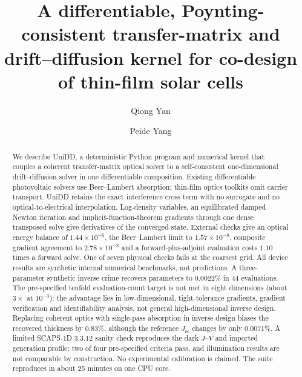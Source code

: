 \documentclass[preprint,12pt]{elsarticle}
\begin{document}
\begin{frontmatter}

\title{A differentiable, Poynting-consistent transfer-matrix and drift--diffusion kernel for co-design of thin-film solar cells}

\author[addr1]{Qiong Yan}

\author[addr2,addr3]{Peide Yang}

\address[addr1]{Department of Electronic Information Science, Fujian Jiangxia
University, Fuzhou 350108, China}
\address[addr2]{School of Electronic Science and Technology, Xiamen University
Tan Kah Kee College, Xiamen, China}
\address[addr3]{Xiamen University Tan Kah Kee College, Key Laboratory of
Intelligent Manufacturing Equipment and Industrial Internet Technology for
Universities of Fujian Province, Xiamen, China}

\begin{abstract}
We describe UniDD, a deterministic Python program and numerical kernel that
couples a coherent transfer-matrix optical solver to a self-consistent
one-dimensional drift--diffusion solver in one differentiable composition.
Existing differentiable photovoltaic solvers use Beer--Lambert absorption;
thin-film optics toolkits omit carrier transport. UniDD retains the exact
interference cross term with no surrogate and no optical-to-electrical
interpolation. Log-density variables, an equilibrated damped Newton iteration
and implicit-function-theorem gradients through one dense transposed solve
give derivatives of the converged state. External checks give an optical
energy balance of $1.44\times10^{-6}$, the Beer--Lambert limit to
$1.57\times10^{-8}$, composite gradient agreement to $2.78\times10^{-3}$ and
a forward-plus-adjoint evaluation costs $1.10$ times a forward solve. One of
seven physical checks fails at the coarsest grid. All device results are
synthetic internal numerical benchmarks, not predictions. A three-parameter
synthetic inverse crime recovers parameters to $0.0022\%$ in 44 evaluations.
The pre-specified tenfold evaluation-count target is not met in eight
dimensions (about $3\times$ at $10^{-3}$): the advantage lies in
low-dimensional, tight-tolerance gradients, gradient verification and
identifiability analysis, not general high-dimensional inverse design.
Replacing coherent optics with single-pass absorption in inverse design
biases the recovered thickness by 0.83\%, although the reference
$J_{\mathrm{sc}}$ changes by only $0.0071\%$. A limited SCAPS-1D 3.3.12
sanity check reproduces the dark $J$--$V$ and imported generation profile;
two of four pre-specified criteria pass, and illumination results are not
comparable by construction. No experimental calibration is claimed. The
suite reproduces in about 25 minutes on one CPU core.
\end{abstract}


\end{frontmatter}
\end{document}
